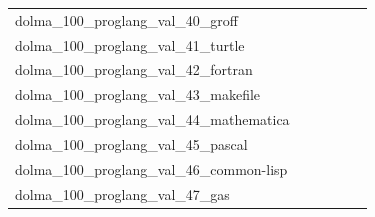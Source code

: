 \documentclass[dvipsnames]{article}
\begin{document}
\begin{appendix}
{\begin{longtable}{m{6cm}m{1.7cm}m{1.7cm}m{1.7cm}m{1.7cm}m{1.7cm}}
	dolma\_100\_proglang\_val\_40\_groff  & \colorbox[HTML]{77c578}{\makebox[\mywidth][c]{6.13}} & \colorbox[HTML]{def2a6}{\makebox[\mywidth][c]{6.32}} & \colorbox[HTML]{ffffe5}{\makebox[\mywidth][c]{7.45}} & \colorbox[HTML]{b7e193}{\makebox[\mywidth][c]{6.22}} & \colorbox[HTML]{b0de8f}{\makebox[\mywidth][c]{6.21}}\\
	dolma\_100\_proglang\_val\_41\_turtle  & \colorbox[HTML]{77c578}{\makebox[\mywidth][c]{2.35}} & \colorbox[HTML]{d3eda0}{\makebox[\mywidth][c]{2.45}} & \colorbox[HTML]{ffffe5}{\makebox[\mywidth][c]{3.17}} & \colorbox[HTML]{a7da8b}{\makebox[\mywidth][c]{2.39}} & \colorbox[HTML]{7ac779}{\makebox[\mywidth][c]{2.35}}\\
	dolma\_100\_proglang\_val\_42\_fortran  & \colorbox[HTML]{91d183}{\makebox[\mywidth][c]{2.32}} & \colorbox[HTML]{e5f4ab}{\makebox[\mywidth][c]{2.39}} & \colorbox[HTML]{ffffe5}{\makebox[\mywidth][c]{2.83}} & \colorbox[HTML]{bae294}{\makebox[\mywidth][c]{2.35}} & \colorbox[HTML]{77c578}{\makebox[\mywidth][c]{2.31}}\\
	dolma\_100\_proglang\_val\_43\_makefile  & \colorbox[HTML]{e3f4aa}{\makebox[\mywidth][c]{2.93}} & \colorbox[HTML]{f8fcc2}{\makebox[\mywidth][c]{3.01}} & \colorbox[HTML]{ffffe5}{\makebox[\mywidth][c]{3.51}} & \colorbox[HTML]{afdd8f}{\makebox[\mywidth][c]{2.86}} & \colorbox[HTML]{77c578}{\makebox[\mywidth][c]{2.82}}\\
	dolma\_100\_proglang\_val\_44\_mathematica  & \colorbox[HTML]{77c578}{\makebox[\mywidth][c]{10.34}} & \colorbox[HTML]{fbfdd0}{\makebox[\mywidth][c]{11.34}} & \colorbox[HTML]{ffffe5}{\makebox[\mywidth][c]{13.24}} & \colorbox[HTML]{a7da8b}{\makebox[\mywidth][c]{10.49}} & \colorbox[HTML]{d7efa2}{\makebox[\mywidth][c]{10.71}}\\
	dolma\_100\_proglang\_val\_45\_pascal  & \colorbox[HTML]{82ca7d}{\makebox[\mywidth][c]{4.18}} & \colorbox[HTML]{fdfedf}{\makebox[\mywidth][c]{4.81}} & \colorbox[HTML]{ffffe5}{\makebox[\mywidth][c]{5.49}} & \colorbox[HTML]{77c578}{\makebox[\mywidth][c]{4.17}} & \colorbox[HTML]{bae294}{\makebox[\mywidth][c]{4.27}}\\
	dolma\_100\_proglang\_val\_46\_common-lisp  & \colorbox[HTML]{77c578}{\makebox[\mywidth][c]{2.56}} & \colorbox[HTML]{ecf7b1}{\makebox[\mywidth][c]{2.71}} & \colorbox[HTML]{ffffe5}{\makebox[\mywidth][c]{3.32}} & \colorbox[HTML]{bbe395}{\makebox[\mywidth][c]{2.62}} & \colorbox[HTML]{8ccf81}{\makebox[\mywidth][c]{2.58}}\\
	dolma\_100\_proglang\_val\_47\_gas  & \colorbox[HTML]{77c578}{\makebox[\mywidth][c]{2.49}} & \colorbox[HTML]{f2fab5}{\makebox[\mywidth][c]{2.73}} & \colorbox[HTML]{ffffe5}{\makebox[\mywidth][c]{3.59}} & \colorbox[HTML]{b6e092}{\makebox[\mywidth][c]{2.57}} & \colorbox[HTML]{9bd587}{\makebox[\mywidth][c]{2.53}}\\

\end{longtable}}
\end{appendix}
\end{document}
